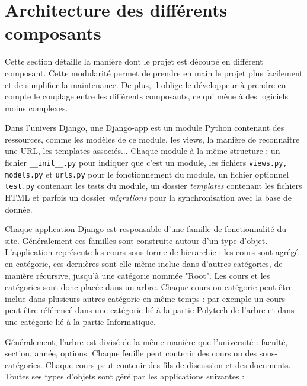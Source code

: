 \documentclass[a4paper,12pt]{article}
\begin{document}
\section{Architecture des différents composants}

Cette section détaille la manière dont le projet est découpé en différent
composant. Cette modularité permet de prendre en main le projet plus facilement
et de simplifier la maintenance. De plus, il oblige le développeur à
prendre en compte le couplage entre les différents composants, ce qui mène
à des logiciels moins complexes.

Dans l'univers Django, une Django-app est un module Python contenant des
ressources, comme les modèles de ce module, les views, la manière de reconnaitre
une URL, les templates associés... Chaque module à la même structure : un fichier
\texttt{\_\_init\_\_.py} pour indiquer que c'est un module, les fichiers
\texttt{views.py, models.py} et \texttt{urls.py} pour le fonctionnement du module,
un fichier optionnel \texttt{test.py} contenant les tests du module, un dossier
\textit{templates} contenant les fichiers HTML et parfois un dossier \textit{migrations}
pour la synchronisation avec la base de donnée.

Chaque application Django est responsable d'une famille de fonctionnalité du site.
Généralement ces familles sont construite autour d'un type d'objet. L'application
représente les cours sous forme de hierarchie : les cours sont agrégé en catégorie,
ces dernières sont elle même inclue dans d'autres catégories, de manière récursive,
jusqu'à une catégorie nommée "Root". Les cours et les catégories sont donc
placée dans un arbre. Chaque cours ou catégorie peut être inclue dans plusieurs
autres catégorie en même temps : par exemple un cours peut être référencé dans
une catégorie lié à la partie Polytech de l'arbre et dans une catégorie lié à la
partie Informatique.

Généralement, l'arbre est divisé de la même manière que l'université : faculté,
section, année, options. Chaque feuille peut contenir des cours ou des sous-catégories.
Chaque cours peut contenir des fils de discussion et des documents. Toutes ses
types d'objets sont géré par les applications suivantes :
\end{document}
